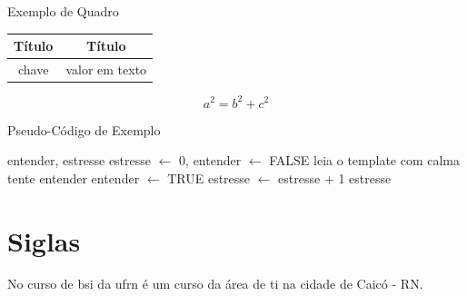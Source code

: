     \begin{quadro}[h]
        \centering
        \caption{Exemplo de Quadro}
        \begin{tabular}{c|c}
            \hline
            \textbf{Título} & \textbf{Título}  \\ \hline
            chave & valor em texto \\ \hline
        \end{tabular}
        \label{tab:quadro}
    \end{quadro}
    
    \begin{equation}
        \label{eq:equacao}
        a^2 = b^2 + c^2
    \end{equation}
    
    \begin{algorithm}[H]
        \caption{Pseudo\hyp{Código} de Exemplo}
        \label{alg:algoritmo}
        \SetAlgoLined
        \begin{algorithmic}[1]
            \REQUIRE entender, estresse
            \ENSURE estresse $\leftarrow$ 0, entender $\leftarrow$ FALSE
            \REPEAT
            	\STATE leia o template com calma
            	\STATE tente entender
                    \STATE entender $\leftarrow$ TRUE
                \ELSE
                    \STATE estresse $\leftarrow$ estresse + 1
                \ENDIF
            \RETURN estresse
        \end{algorithmic}
    \end{algorithm}
    \begin{center}
        \vspace{-2em}
    \end{center}
    
    \section{Siglas}
        \label{sec:siglas}
        
        No curso de \ac{bsi} da \ac{ufrn} é um curso da área de \ac{ti} na cidade de Caicó - RN.
